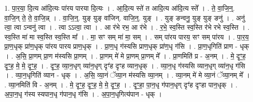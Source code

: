 \documentclass[17pt]{extarticle}
\begin{document}
1. पा॒र॒या॒ दि॒त्य आ॑दि॒त्यः पा॑रय पारया दि॒त्यः । . आ॒दि॒त्य स्ते॑ त आदि॒त्य आ॑दि॒त्य स्ते᳚ । . ते॒ वा॒जि॒न्॒. वा॒जि॒न् ते॒ ते॒ वा॒जि॒न्न् । . वा॒जि॒न्॒. युङ् युङ् वा॑जिन्. वाजि॒न्॒. युङ् । . युङ् ङन्वनु॒ युङ् युङ् ङनु॑ । . अनु॑ त्वा॒ त्वा ऽन्वनु॑ त्वा । . त्वा ऽऽत्वा॒ त्वा । . आ र॑भे रभ॒ आ र॑भे । . र॒भे॒ स्व॒स्ति स्व॒स्ति र॑भे रभे स्व॒स्ति । . स्व॒स्ति मा॑ मा स्व॒स्ति स्व॒स्ति मा᳚ । . मा॒ सꣳ सम् मा॑ मा॒ सम् । . सम् पा॑रय पारय॒ सꣳ सम् पा॑रय । . पा॒र॒य॒ प्रा॒ण॒धृक् प्रा॑ण॒धृक् पा॑रय पारय प्राण॒धृक् । . प्रा॒ण॒धृ ग॑स्यसि प्राण॒धृक् प्रा॑ण॒धृ ग॑सि । . प्रा॒ण॒धृगिति॑ प्राण - धृक् । . अ॒सि॒ प्रा॒णम् प्रा॒ण म॑स्यसि प्रा॒णम् । . प्रा॒णम् मे॑ मे प्रा॒णम् प्रा॒णम् मे᳚ । . प्रा॒णमिति॑ प्र - अ॒नम् । . मे॒ दृꣳ॒॒ह॒ दृꣳ॒॒ह॒ मे॒ मे॒ दृꣳ॒॒ह॒ । . दृꣳ॒॒ह॒ व्या॒न॒धृग् व्या॑न॒धृग् दृꣳ॑ह दृꣳह व्यान॒धृक् । . व्या॒न॒धृ ग॑स्यसि व्यान॒धृग् व्या॑न॒धृ ग॑सि । . व्या॒न॒धृगिति॑ व्यान - धृक् । . अ॒सि॒ व्या॒नं ॅव्या॒न म॑स्यसि व्या॒नम् । . व्या॒नम् मे॑ मे व्या॒नं ॅव्या॒नम् मे᳚ । . व्या॒नमिति॑ वि - अ॒नम् । . मे॒ दृꣳ॒॒ह॒ दृꣳ॒॒ह॒ मे॒ मे॒ दृꣳ॒॒ह॒ । . दृꣳ॒॒हा॒ पा॒न॒धृ ग॑पान॒धृग् दृꣳ॑ह दृꣳहा पान॒धृक् । . अ॒पा॒न॒धृ ग॑स्य स्यपान॒धृ ग॑पान॒धृ ग॑सि । . अ॒पा॒न॒धृगित्य॑पान - धृक् । \newline
\end{document}
